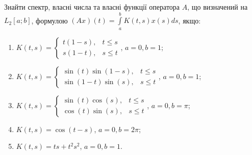 \begin{exercise}
    Знайти спектр, власні числа та власні функції оператора $A$,
    що визначений на $L_2[a;b]$, формулою $(Ax)(t) = \int\limits_a^b K(t,s) x(s)ds$, якщо:
    \begin{enumerate}
        \item $K(t,s) = \begin{cases}
            t(1-s), & t \leq s \\
            s(1-t), & s \leq t
        \end{cases}$, $a = 0, b = 1$;
        \item $K(t,s) = \begin{cases}
            \sin(t)\sin(1-s), & t \leq s \\
            \sin(1-t)\sin(s), & s \leq t
        \end{cases}$, $a = 0, b = 1$;
        \item $K(t,s) = \begin{cases}
            \sin(t)\cos(s), & t \leq s \\
            \cos(t)\sin(s), & s \leq t
        \end{cases}$, $a = 0, b = \pi$;
        \item $K(t,s) = \cos(t-s)$, $a = 0, b = 2\pi$;
        \item $K(t,s) = ts + t^2 s^2$, $a = 0, b = 1$.
    \end{enumerate}
\end{exercise}